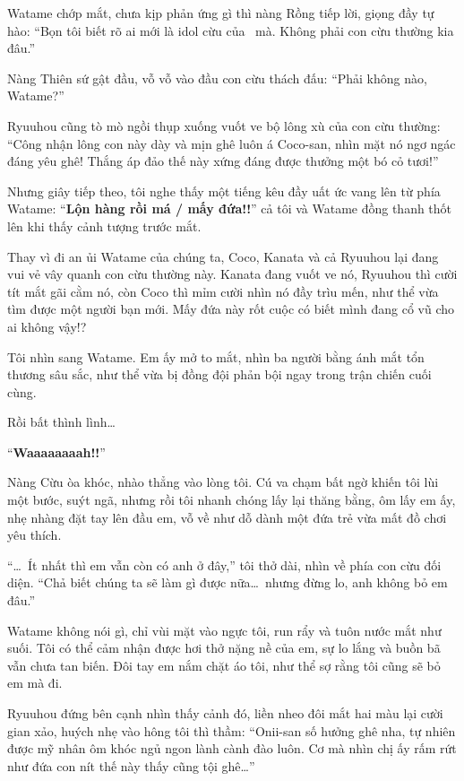 \documentclass[../main.tex]{subfiles}
\begin{document}
Watame chớp mắt, chưa kịp phản ứng gì thì nàng Rồng tiếp lời, giọng đầy tự hào: ``Bọn tôi biết rõ ai mới là idol cừu của \hll\ mà. Không phải con cừu thường kia đâu.''

Nàng Thiên sứ gật đầu, vỗ vỗ vào đầu con cừu thách đấu: ``Phải không nào, Watame?''

Ryuuhou cũng tò mò ngồi thụp xuống vuốt ve bộ lông xù của con cừu thường: ``Công nhận lông con này dày và mịn ghê luôn á Coco-san, nhìn mặt nó ngơ ngác đáng yêu ghê! Thắng áp đảo thế này xứng đáng được thưởng một bó cỏ tươi!''


Nhưng giây tiếp theo, tôi nghe thấy một tiếng kêu đầy uất ức vang lên từ phía Watame: ``\textbf{Lộn hàng rồi má / mấy đứa!!}''  cả tôi và Watame đồng thanh thốt lên khi thấy cảnh tượng trước mắt.

Thay vì đi an ủi Watame của chúng ta, Coco, Kanata và cả Ryuuhou lại đang vui vẻ vây quanh con cừu thường này. Kanata đang vuốt ve nó, Ryuuhou thì cười tít mắt gãi cằm nó, còn Coco thì mỉm cười nhìn nó đầy trìu mến, như thể vừa tìm được một người bạn mới. Mấy đứa này rốt cuộc có biết mình đang cổ vũ cho ai không vậy!?

Tôi nhìn sang Watame. Em ấy mở to mắt, nhìn ba người bằng ánh mắt tổn thương sâu sắc, như thể vừa bị đồng đội phản bội ngay trong trận chiến cuối cùng.

Rồi bất thình lình\dots

``\textbf{Waaaaaaaah!!}''

Nàng Cừu òa khóc, nhào thẳng vào lòng tôi. Cú va chạm bất ngờ khiến tôi lùi một bước, suýt ngã, nhưng rồi tôi nhanh chóng lấy lại thăng bằng, ôm lấy em ấy, nhẹ nhàng đặt tay lên đầu em, vỗ về như dỗ dành một đứa trẻ vừa mất đồ chơi yêu thích.

``\dots\ Ít nhất thì em vẫn còn có anh ở đây,'' tôi thở dài, nhìn về phía con cừu đối diện. ``Chả biết chúng ta sẽ làm gì được nữa\dots\ nhưng đừng lo, anh không bỏ em đâu.''

Watame không nói gì, chỉ vùi mặt vào ngực tôi, run rẩy và tuôn nước mắt như suối. Tôi có thể cảm nhận được hơi thở nặng nề của em, sự lo lắng và buồn bã vẫn chưa tan biến. Đôi tay em nắm chặt áo tôi, như thể sợ rằng tôi cũng sẽ bỏ em mà đi.

Ryuuhou đứng bên cạnh nhìn thấy cảnh đó, liền nheo đôi mắt hai màu lại cười gian xảo, huých nhẹ vào hông tôi thì thầm: ``Onii-san số hưởng ghê nha, tự nhiên được mỹ nhân ôm khóc ngủ ngon lành cành đào luôn. Cơ mà nhìn chị ấy rấm rứt như đứa con nít thế này thấy cũng tội ghê\dots''
\end{document}
